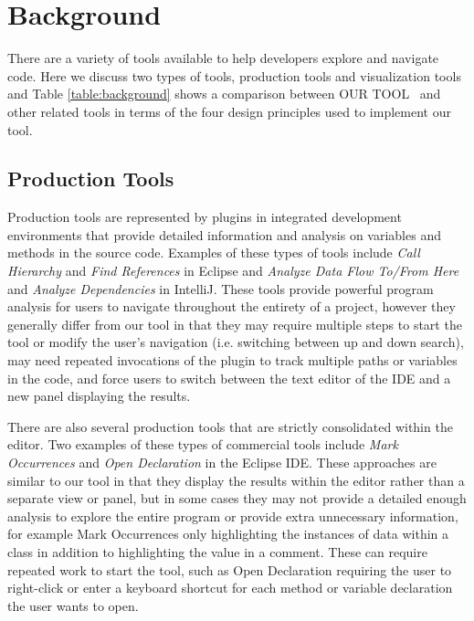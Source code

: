 \documentclass[conference]{IEEEtran}
\newcommand{\toolName}{OUR TOOL}
\begin{document}
\section{Background}
There are a variety of tools available to help developers explore and navigate code. Here we discuss two types of tools, production tools and visualization tools and Table \ref{table:background} shows a comparison between \toolName~ and other related tools in terms of the four design principles used to implement our tool.

\subsection{Production Tools}
Production tools are represented by plugins in integrated development environments that provide detailed information and analysis on variables and methods in the source code. Examples of these types of tools include \emph{Call Hierarchy} and \emph{Find References} in Eclipse\cite{Eclipse} and \emph{Analyze Data Flow To/From Here} and \emph{Analyze Dependencies} in IntelliJ\cite{IntelliJ}. These tools provide powerful program analysis for users to navigate throughout the entirety of a project, however they generally differ from our tool in that they may require multiple steps to start the tool or modify the user's navigation (i.e. switching between up and down search), may need repeated invocations of the plugin to track multiple paths or variables in the code, and force users to switch between the text editor of the IDE and a new panel displaying the results.

There are also several production tools that are strictly consolidated within the editor. Two examples of these types of commercial tools include \emph{Mark Occurrences}\cite{MarkOccurrences} and \emph{Open Declaration} in the Eclipse IDE. These approaches are similar to our tool in that they display the results within the editor rather than a separate view or panel, but in some cases they may not provide a detailed enough analysis to explore the entire program or provide extra unnecessary information, for example Mark Occurrences only highlighting the instances of data within a class in addition to highlighting the value in a comment. These can require repeated work to start the tool, such as Open Declaration requiring the user to right-click or enter a keyboard shortcut for each method or variable declaration the user wants to open.
\end{document}
